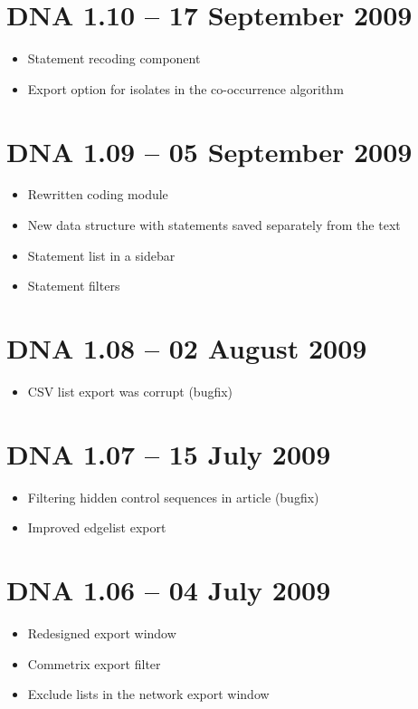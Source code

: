 \documentclass[12pt,a4paper]{scrreprt}
\begin{document}
\section*{DNA 1.10 -- 17 September 2009}
\begin{itemize}
 \item Statement recoding component
 \item Export option for isolates in the co-occurrence algorithm
\end{itemize}

\section*{DNA 1.09 -- 05 September 2009}
\begin{itemize}
 \item Rewritten coding module
 \item New data structure with statements saved separately from the text
 \item Statement list in a sidebar
 \item Statement filters
\end{itemize}

\section*{DNA 1.08 -- 02 August 2009}
\begin{itemize}
 \item CSV list export was corrupt (bugfix)
\end{itemize}

\section*{DNA 1.07 -- 15 July 2009}
\begin{itemize}
 \item Filtering hidden control sequences in article (bugfix)
 \item Improved edgelist export
\end{itemize}

\section*{DNA 1.06 -- 04 July 2009}
\begin{itemize}
 \item Redesigned export window
 \item Commetrix export filter
 \item Exclude lists in the network export window
\end{itemize}
\end{document}
